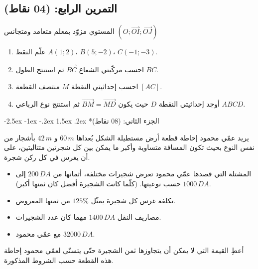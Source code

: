 \documentclass[12pt,a4paper]{article}
\makeatletter
\renewcommand\section{\@startsection{section}{1}{\z@}%
  {-2.5ex \@plus -1ex \@minus -.2ex}%
  {1.5ex \@plus.2ex}%
  {\normalfont\large\bfseries}}
\makeatother
\begin{document}
\subsection*{التمرين الرابع: (04 نقاط)}

المستوي مزوّد بمعلم متعامد ومتجانس $\left(O;\overrightarrow{OI};\overrightarrow{OJ}\right)$

\begin{enumerate}
    \item علّم النقط $A(1;2)$، $B(5;-2)$، $C(-1;-3)$.
    \item احسب مركّبتي الشعاع $\overrightarrow{BC}$ ثم استنتج الطول $BC$.
    \item احسب إحداثيتي النقطة $M$ منتصف القطعة $[AC]$.
    \item أوجد إحداثيتي النقطة $D$ حيث يكون $\overrightarrow{BM} = \overrightarrow{MD}$ ثم استنتج نوع الرباعي $ABCD$.
\end{enumerate}

\section*{الجزء الثاني: (08 نقاط)}

يريد عمّي محمود إحاطة قطعة أرض مستطيلة الشكل بُعداها $60\,m$ و $42\,m$ بأشجار من نفس النوع بحيث تكون المسافة متساوية وأكبر ما يمكن بين كل شجرتين متتاليتين، على أن يغرس في كل ركن شجرة.

\begin{itemize}
    \item المشتلة التي قصدها عمّي محمود تعرض شجيرات مختلفة، أثمانها من $200\,DA$ إلى $1000\,DA$ حسب نوعيتها. (كلّما كانت الشجيرة أفضل كان ثمنها أكبر).
    \item تكلفة غرس كل شجيرة يمثّل $125\%$ من ثمنها المعروض.
    \item مصاريف النقل $1400\,DA$ مهما كان عدد الشجيرات.
    \item مع عمّي محمود $32000\,DA$.
\end{itemize}

أعطِ القيمة التي لا يمكن أن يتجاوزها ثمن الشجيرة حتّى يتسنّى لعمّي محمود إحاطة هذه القطعة حسب الشروط المذكورة.
\end{document}
